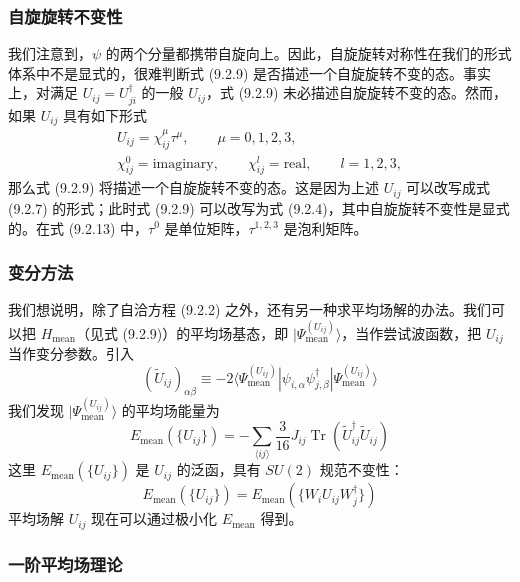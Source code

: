 \subsubsection{自旋旋转不变性}

我们注意到，$\psi$ 的两个分量都携带自旋向上。因此，自旋旋转对称性在我们的形式体系中不是显式的，很难判断式 (9.2.9) 是否描述一个自旋旋转不变的态。事实上，对满足 $U_{ij}=U^{\dagger}_{ji}$ 的一般 $U_{ij}$，式 (9.2.9) 未必描述自旋旋转不变的态。然而，如果 $U_{ij}$ 具有如下形式
\begin{equation*}
\begin{array}{l}
U_{ij}=\chi^{\mu}_{ij}\tau^{\mu},\qquad \mu=0,1,2,3,\\
\chi^0_{ij}=\text{imaginary},\qquad \chi^l_{ij}=\text{real},\qquad l=1,2,3,
\end{array}
\tag{9.2.13}
\end{equation*}
那么式 (9.2.9) 将描述一个自旋旋转不变的态。这是因为上述 $U_{ij}$ 可以改写成式 (9.2.7) 的形式；此时式 (9.2.9) 可以改写为式 (9.2.4)，其中自旋旋转不变性是显式的。在式 (9.2.13) 中，$\tau^0$ 是单位矩阵，$\tau^{1,2,3}$ 是泡利矩阵。

\subsubsection{变分方法}

我们想说明，除了自洽方程 (9.2.2) 之外，还有另一种求平均场解的办法。我们可以把 $H_{\text{mean}}$（见式 (9.2.9)）的平均场基态，即 $|\Psi^{(U_{ij})}_{\text{mean}}\rangle$，当作尝试波函数，把 $U_{ij}$ 当作变分参数。引入
\begin{equation*}
(\tilde{U}_{ij})_{\alpha\beta}\equiv-2\langle\Psi^{(U_{ij})}_{\text{mean}}|\psi_{i,\alpha}\psi^{\dagger}_{j,\beta}|\Psi^{(U_{ij})}_{\text{mean}}\rangle
\end{equation*}
我们发现 $|\Psi^{(U_{ij})}_{\text{mean}}\rangle$ 的平均场能量为
\begin{equation*}
E_{\text{mean}}(\{U_{ij}\})=-\sum_{\langle ij\rangle}\frac{3}{16}J_{ij}\operatorname{Tr}(\tilde{U}^{\dagger}_{ij}\tilde{U}_{ij})
\tag{9.2.14}
\end{equation*}
这里 $E_{\text{mean}}(\{U_{ij}\})$ 是 $U_{ij}$ 的泛函，具有 $SU(2)$ 规范不变性：
\begin{equation*}
E_{\text{mean}}(\{U_{ij}\})=E_{\text{mean}}(\{W_iU_{ij}W^{\dagger}_j\})
\end{equation*}
平均场解 $U_{ij}$ 现在可以通过极小化 $E_{\text{mean}}$ 得到。

\subsubsection{一阶平均场理论}

